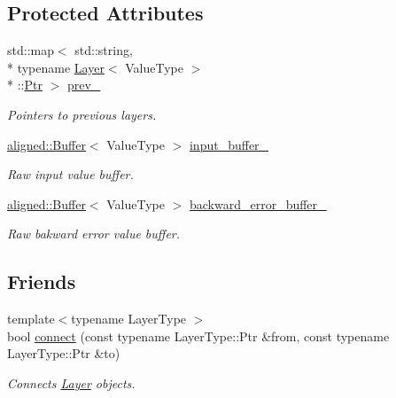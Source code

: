 \subsection*{Protected Attributes}
\begin{DoxyCompactItemize}
\item 
std\-::map$<$ std\-::string, \\*
typename \hyperlink{classffnn_1_1layer_1_1_layer}{Layer}$<$ Value\-Type $>$\\*
\-::\hyperlink{classffnn_1_1layer_1_1_layer_ab909b3fbacb9688059f9f22302f266f4}{Ptr} $>$ \hyperlink{classffnn_1_1layer_1_1_layer_ab1546472cf5b9c87aed6f75852e123c7}{prev\-\_\-}
\begin{DoxyCompactList}\small\item\em Pointers to previous layers. \end{DoxyCompactList}\item 
\hyperlink{structffnn_1_1aligned_1_1_buffer}{aligned\-::\-Buffer}$<$ Value\-Type $>$ \hyperlink{classffnn_1_1layer_1_1_layer_a4fca9b89de71c97f1d7747e15c14329a}{input\-\_\-buffer\-\_\-}
\begin{DoxyCompactList}\small\item\em Raw input value buffer. \end{DoxyCompactList}\item 
\hyperlink{structffnn_1_1aligned_1_1_buffer}{aligned\-::\-Buffer}$<$ Value\-Type $>$ \hyperlink{classffnn_1_1layer_1_1_layer_a5509038fd1d1d06edd90af93013c35e1}{backward\-\_\-error\-\_\-buffer\-\_\-}
\begin{DoxyCompactList}\small\item\em Raw bakward error value buffer. \end{DoxyCompactList}\end{DoxyCompactItemize}
\subsection*{Friends}
\begin{DoxyCompactItemize}
\item 
{\footnotesize template$<$typename Layer\-Type $>$ }\\bool \hyperlink{classffnn_1_1layer_1_1_layer_afbf91ff52dc8c3e894968dcc27cdecd5}{connect} (const typename Layer\-Type\-::\-Ptr \&from, const typename Layer\-Type\-::\-Ptr \&to)
\begin{DoxyCompactList}\small\item\em Connects \hyperlink{classffnn_1_1layer_1_1_layer}{Layer} objects. \end{DoxyCompactList}\end{DoxyCompactItemize}


